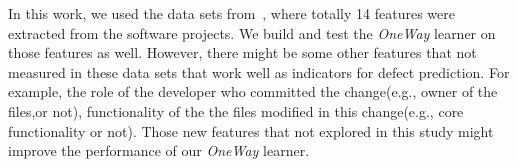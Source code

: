 In this work, we used the data sets from~\cite{yang2016effort,kamei2013large}, where
totally 14 features were extracted from the software projects.  We build and test the
{\it OneWay} learner on those features as well. However, there might be some other features
that not measured in these data sets that work well as indicators for defect prediction.
For example, the role of the developer who committed the change(e.g., owner of the files,or not),
functionality of the the files modified in this change(e.g., core functionality or not).
Those new features that not explored in this study might improve the performance of 
our {\it OneWay} learner.
